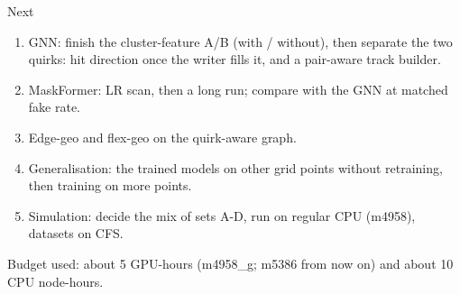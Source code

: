 \documentclass[aspectratio=169,10pt]{beamer}
\begin{document}
\begin{frame}{Next}
\footnotesize
\begin{enumerate}
\item GNN: finish the cluster-feature A/B (with / without), then separate the two quirks: hit direction once the writer fills it, and a pair-aware track builder.
\item MaskFormer: LR scan, then a long run; compare with the GNN at matched fake rate.
\item Edge-geo and flex-geo on the quirk-aware graph.
\item Generalisation: the trained models on other grid points without retraining, then training on more points.
\item Simulation: decide the mix of sets A-D, run on regular CPU (m4958), datasets on CFS.
\end{enumerate}

\vspace{1em}
Budget used: about 5 GPU-hours (m4958\_g; m5386 from now on) and about 10 CPU node-hours.
\end{frame}
\end{document}
